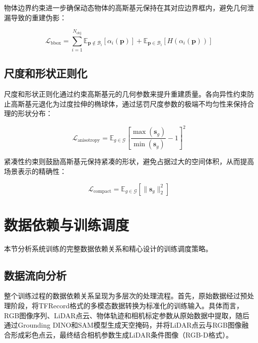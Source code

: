 物体边界约束进一步确保动态物体的高斯基元保持在其对应边界框内，避免几何泄漏导致的重建伪影：

\begin{equation}
\mathcal{L}_{\text{bbox}} = \sum_{i=1}^{N_{\text{obj}}} \mathbb{E}_{\mathbf{p} \notin \mathcal{B}_i} [\alpha_i(\mathbf{p})] + \mathbb{E}_{\mathbf{p} \in \mathcal{B}_i} [H(\alpha_i(\mathbf{p}))]
\label{eq:bbox_constraint}
\end{equation}

\subsection{尺度和形状正则化}

尺度和形状正则化通过约束高斯基元的几何参数来提升重建质量。各向异性约束防止高斯基元退化为过度拉伸的椭球体，通过惩罚尺度参数的极端不均匀性来保持合理的形状分布：

\begin{equation}
\mathcal{L}_{\text{anisotropy}} = \mathbb{E}_{g \in \mathcal{G}} \left[ \frac{\max(\mathbf{s}_g)}{\min(\mathbf{s}_g)} - 1 \right]^2
\label{eq:anisotropy_regularization}
\end{equation}

紧凑性约束则鼓励高斯基元保持紧凑的形状，避免占据过大的空间体积，从而提高场景表示的精确性：

\begin{equation}
\mathcal{L}_{\text{compact}} = \mathbb{E}_{g \in \mathcal{G}} \left[ \|\mathbf{s}_g\|_2^2 \right]
\label{eq:compactness_regularization}
\end{equation}

\section{数据依赖与训练调度}

本节分析系统训练的完整数据依赖关系和精心设计的训练调度策略。

\subsection{数据流向分析}

整个训练过程的数据依赖关系呈现为多层次的处理流程。首先，原始数据经过预处理阶段，将TFRecord格式的多模态数据转换为标准化的训练输入。具体而言，RGB图像序列、LiDAR点云、物体轨迹和相机标定参数从原始数据中提取，随后通过Grounding DINO和SAM模型生成天空掩码，并将LiDAR点云与RGB图像融合形成彩色点云，最终结合相机参数生成LiDAR条件图像（RGB-D格式）。

